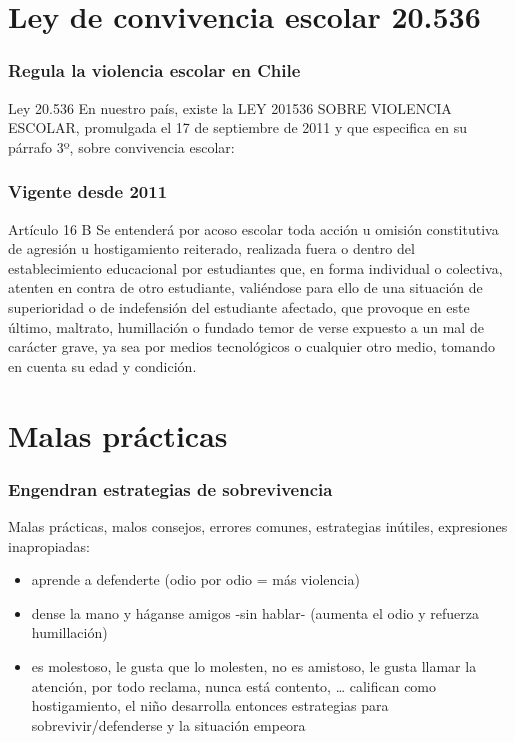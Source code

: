 \documentclass[12pt,spanish,x11names,svgnames]{beamer}
\begin{document}
\section{Ley de convivencia escolar 20.536}
\begin{frame}
  \frametitle{Regula la violencia escolar en Chile}
  \begin{block}{Ley 20.536}
    En nuestro país, existe la LEY 201536 SOBRE VIOLENCIA ESCOLAR, promulgada el 17 de septiembre de 2011 y que especifica en su párrafo 3º, sobre convivencia escolar:
  \end{block}
\end{frame}
\begin{frame}
  \frametitle{Vigente desde 2011}
  \begin{block}{Artículo 16 B}
    Se entenderá por acoso escolar toda acción u omisión constitutiva de agresión u hostigamiento reiterado, realizada fuera o dentro del establecimiento educacional por estudiantes que, en forma individual o colectiva, atenten en contra de otro estudiante, valiéndose para ello de una situación de superioridad o de indefensión del estudiante afectado, que provoque en este último, maltrato, humillación o fundado temor de verse expuesto a un mal de carácter grave, ya sea por medios tecnológicos o cualquier otro medio, tomando en cuenta su edad y condición.
  \end{block}
\end{frame}
\section{Malas prácticas}
\begin{frame}
  \frametitle{Engendran estrategias de sobrevivencia}
  \begin{alertblock}{Malas prácticas, malos consejos, errores comunes, estrategias inútiles, expresiones inapropiadas:}
    \begin{itemize}
    \item<+-> aprende a defenderte (odio por odio = más violencia)
    \item<+-> dense la mano y háganse amigos -sin hablar- (aumenta el odio y
        refuerza humillación)
      \item<+-> es molestoso, le gusta que lo molesten, no es amistoso, le gusta llamar la atención, por todo reclama, nunca está contento, …​ califican como hostigamiento, el niño desarrolla entonces estrategias para sobrevivir/defenderse y la situación empeora   
    \end{itemize}
  \end{alertblock}
\end{frame}
\end{document}
